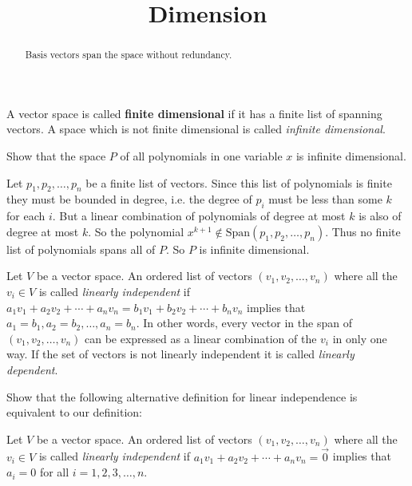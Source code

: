 \documentclass{ximera}
\title{Dimension}
\begin{document}
\begin{abstract}
  Basis vectors span the space without redundancy.
\end{abstract}

  \begin{definition}
 	A vector space is called \textbf{finite dimensional} if it has a finite list of spanning vectors.  A space which is not finite dimensional is called \textit{infinite dimensional}.
 \end{definition}
 
 	Show that the space $P$ of all polynomials in one variable $x$ is infinite dimensional.

\begin{free-response}
	 Let $p_1,p_2,\ldots,p_n$ be a finite list of  vectors.  
	Since this list of polynomials is finite they must be bounded in degree, i.e.  the degree of $p_i$ must be less than some $k$ for each $i$.  But a linear combination
	of polynomials of degree at most $k$ is also of degree at most $k$.  So the polynomial $x^{k+1} \not\in  \textrm{Span}(p_1,p_2,\ldots,p_n)$. Thus no finite list of 
	polynomials spans all of $P$.  So $P$ is infinite dimensional.
\end{free-response}

 \begin{definition}
 	Let $V$ be a vector space. An ordered list of vectors $(v_1,v_2,\ldots,v_n)$ where all the $v_i \in V$ is called \textit{linearly independent} if
 	$a_1v_1+a_2v_2 + \cdots +a_nv_n = b_1v_1 + b_2v_2 + \cdots + b_nv_n$ implies that $a_1  = b_1, a_2 = b_2, \ldots,a_n=b_n$.  In other words,
 	every vector in the span of $(v_1,v_2,\ldots,v_n)$ can be expressed as a linear combination of the $v_i$ in only one way.  
 	If the set of vectors is not linearly independent it is called \textit{linearly dependent}.
 \end{definition}
 
 
 	Show that the following alternative definition for linear independence is equivalent to our definition:
 	
 	\begin{definition}
 		Let $V$ be a vector space. An ordered list of vectors $(v_1,v_2,\ldots,v_n)$ where all the $v_i \in V$ is called \textit{linearly independent} if
 	$a_1v_1+a_2v_2 + \cdots +a_nv_n = \vec{0}$ implies that $a_i = 0 $ for all $i=1,2,3,\ldots,n$.
 	\end{definition}
 	
\end{document}
